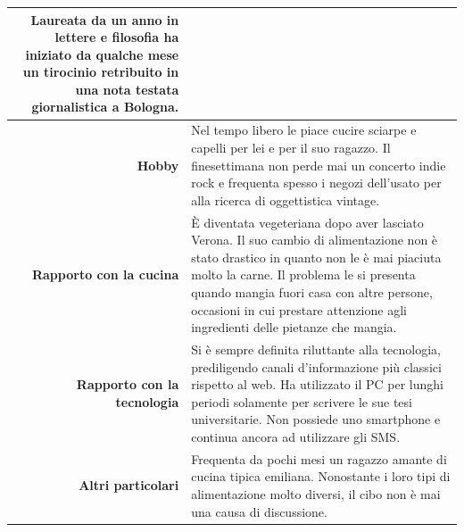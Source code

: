 \begin{table}[H]
\begin{centering}
\begin{tabular} { | r  p{12cm} | }
Laureata da un anno in lettere e filosofia ha iniziato da qualche mese
un tirocinio retribuito in una nota testata giornalistica a Bologna. \\\hline
		\textbf{Hobby} & Nel tempo libero le piace cucire sciarpe e
capelli per lei e per il suo ragazzo. Il finesettimana non perde mai un
concerto indie rock e frequenta spesso i negozi dell'usato per alla
ricerca di oggettistica vintage. \\ \hline
		\textbf{Rapporto con la cucina} & È diventata vegeteriana dopo
aver lasciato Verona. Il suo cambio di alimentazione non è stato
drastico in quanto non le è mai piaciuta molto la carne. Il problema le
si presenta quando mangia fuori casa con altre persone, occasioni in cui
prestare attenzione agli ingredienti delle pietanze che mangia. \\ \hline
		\textbf{Rapporto con la tecnologia} & Si è sempre definita
riluttante alla tecnologia, prediligendo canali d'informazione più
classici rispetto al web. Ha utilizzato il PC per lunghi periodi
solamente per scrivere le sue tesi universitarie. Non possiede uno
smartphone e continua ancora ad utilizzare gli SMS.\\ \hline
		\textbf{Altri particolari} & Frequenta da pochi mesi un ragazzo
amante di cucina tipica emiliana. Nonostante i loro tipi di
alimentazione molto diversi, il cibo non è mai una causa di discussione. \\\hline
	\end{tabular}
	\end{centering}
\end{table}

